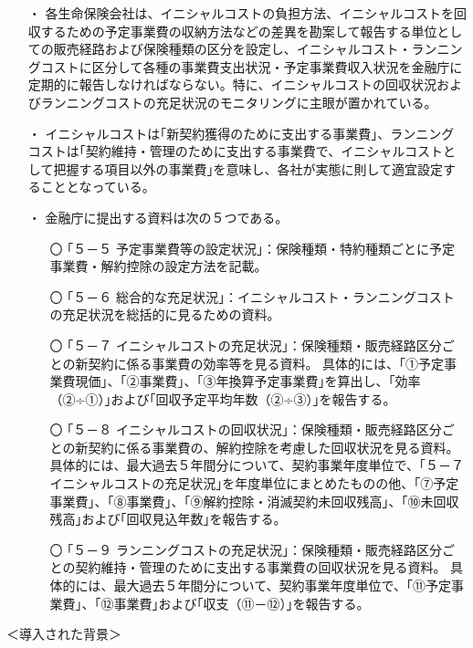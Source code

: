 \documentclass[report,gutter=10mm,fore-edge=10mm,uplatex,dvipdfmx]{jlreq}
\begin{document}
 \begin{itemize}
  \item[・]  各生命保険会社は、イニシャルコストの負担方法、イニシャルコストを回収するための予定事業費の収納方法などの差異を勘案して報告する単位としての販売経路および保険種類の区分を設定し、イニシャルコスト・ランニングコストに区分して各種の事業費支出状況・予定事業費収入状況を金融庁に定期的に報告しなければならない。特に、イニシャルコストの回収状況およびランニングコストの充足状況のモニタリングに主眼が置かれている。
  \item[・]  イニシャルコストは｢新契約獲得のために支出する事業費｣、ランニングコストは｢契約維持・管理のために支出する事業費で、イニシャルコストとして把握する項目以外の事業費｣を意味し、各社が実態に則して適宜設定することとなっている。
  \item[・]  金融庁に提出する資料は次の５つである。
 \begin{itemize}
  \item[〇]  ｢５－５ 予定事業費等の設定状況｣：保険種類・特約種類ごとに予定事業費・解約控除の設定方法を記載。
  \item[〇]  ｢５－６ 総合的な充足状況｣：イニシャルコスト・ランニングコストの充足状況を総括的に見るための資料。
  \item[〇]  ｢５－７ イニシャルコストの充足状況｣：保険種類・販売経路区分ごとの新契約に係る事業費の効率等を見る資料。
  具体的には、｢①予定事業費現価｣、｢②事業費｣、｢③年換算予定事業費｣を算出し、｢効率（②÷①）｣および｢回収予定平均年数（②÷③）｣を報告する。
  \item[〇]  ｢５－８ イニシャルコストの回収状況｣：保険種類・販売経路区分ごとの新契約に係る事業費の、解約控除を考慮した回収状況を見る資料。
  具体的には、最大過去５年間分について、契約事業年度単位で、｢５－７ イニシャルコストの充足状況｣を年度単位にまとめたものの他、｢⑦予定事業費｣、｢⑧事業費｣、｢⑨解約控除・消滅契約未回収残高｣、｢⑩未回収残高｣および｢回収見込年数｣を報告する。
  \item[〇]  ｢５－９ ランニングコストの充足状況｣：保険種類・販売経路区分ごとの契約維持・管理のために支出する事業費の回収状況を見る資料。
  具体的には、最大過去５年間分について、契約事業年度単位で、｢⑪予定事業費｣、｢⑫事業費｣および｢収支（⑪－⑫）｣を報告する。
 \end{itemize}
 \end{itemize}

＜導入された背景＞
\end{document}

